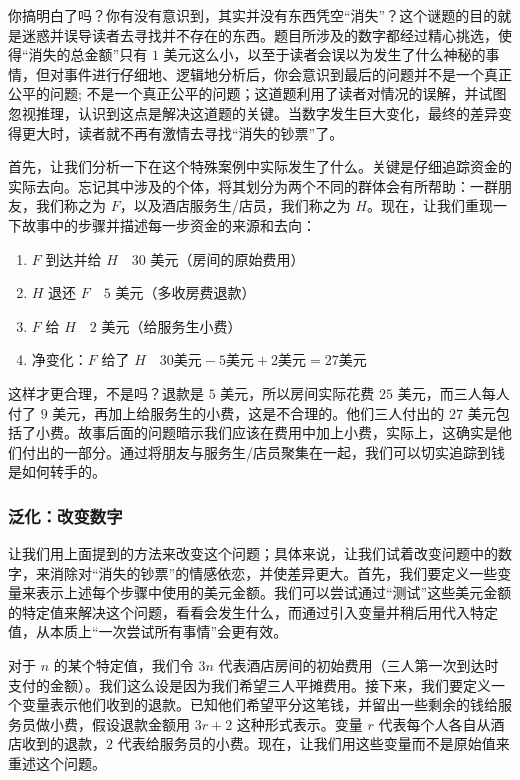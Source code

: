 你搞明白了吗？你有没有意识到，其实并没有东西凭空``消失''？这个谜题的目的就是迷惑并误导读者去寻找并不存在的东西。题目所涉及的数字都经过精心挑选，使得``消失的总金额''只有 $1$ 美元这么小，以至于读者会误以为发生了什么神秘的事情，但对事件进行仔细地、逻辑地分析后，你会意识到最后的问题并不是一个真正公平的问题; 不是一个真正公平的问题；这道题利用了读者对情况的误解，并试图忽视推理，认识到这点是解决这道题的关键。当数字发生巨大变化，最终的差异变得更大时，读者就不再有激情去寻找``消失的钞票''了。

首先，让我们分析一下在这个特殊案例中实际发生了什么。关键是仔细追踪资金的实际去向。忘记其中涉及的个体，将其划分为两个不同的群体会有所帮助：一群朋友，我们称之为 $F$，以及酒店服务生/店员，我们称之为 $H$。现在，让我们重现一下故事中的步骤并描述每一步资金的来源和去向：

\begin{enumerate}
    \item $F$ 到达并给 $H \quad 30$ 美元（房间的原始费用）
    \item $H$ 退还 $F \quad 5$ 美元（多收房费退款）
    \item $F$ 给 $H \quad 2$ 美元（给服务生小费）
    \item 净变化：$F$ 给了 $H \quad 30 \text{美元} -5 \text{美元} + 2 \text{美元} = 27 \text{美元}$
\end{enumerate}

这样才更合理，不是吗？退款是 $5$ 美元，所以房间实际花费 $25$ 美元，而三人每人付了 $9$ 美元，再加上给服务生的小费，这是不合理的。他们三人付出的 $27$ 美元包括了小费。故事后面的问题暗示我们应该在费用中加上小费，实际上，这确实是他们付出的一部分。通过将朋友与服务生/店员聚集在一起，我们可以切实追踪到钱是如何转手的。

\subsubsection*{泛化：改变数字}

让我们用上面提到的方法来改变这个问题；具体来说，让我们试着改变问题中的数字，来消除对``消失的钞票''的情感依恋，并使差异更大。首先，我们要定义一些变量来表示上述每个步骤中使用的美元金额。我们可以尝试通过``测试''这些美元金额的特定值来解决这个问题，看看会发生什么，而通过引入变量并稍后用代入特定值，从本质上``一次尝试所有事情''会更有效。

对于 $n$ 的某个特定值，我们令 $3n$ 代表酒店房间的初始费用（三人第一次到达时支付的金额）。我们这么设是因为我们希望三人平摊费用。接下来，我们要定义一个变量表示他们收到的退款。已知他们希望平分这笔钱，并留出一些剩余的钱给服务员做小费，假设退款金额用 $3r + 2$ 这种形式表示。变量 $r$ 代表每个人各自从酒店收到的退款，$2$ 代表给服务员的小费。现在，让我们用这些变量而不是原始值来重述这个问题。

